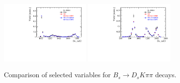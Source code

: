 \begin{figure}[h]
\includegraphics[height=!,width=0.4\textwidth]{figs/dataVsMC/signal_final/combined/Ds2KKpi_1_Ds_m12.pdf}
\includegraphics[height=!,width=0.4\textwidth]{figs/dataVsMC/signal_final/combined/Ds2KKpi_1_Ds_m13.pdf}

\caption{Comparison of selected variables for $B_s\to D_sK\pi\pi$ decays.}
\label{fig:}
\end{figure}

